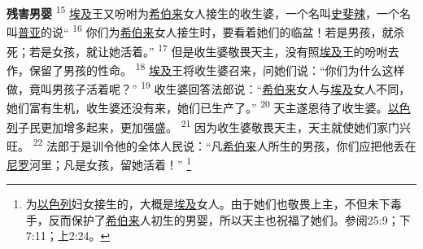 \begin{multicols}{2}
\textbf{残害男婴 }
\textsuperscript{15}
\uline{埃及}王又吩咐为\uline{希伯来}女人接生的收生婆，一个名叫\uline{史斐辣}，一个名叫\uline{普亚}的说“
\textsuperscript{16}
你们为\uline{希伯来}女人接生时，要看着她们的临盆！若是男孩，就杀死；若是女孩，就让她活着。”
\textsuperscript{17}
但是收生婆敬畏天主，没有照\uline{埃及}王的吩咐去作，保留了男孩的性命。
\textsuperscript{18}
\uline{埃及}王将收生婆召来，问她们说：“你们为什么这样做，竟叫男孩子活着呢？”
\textsuperscript{19}
收生婆回答法郎说：“\uline{希伯来}女人与\uline{埃及}女人不同，她们富有生机，收生婆还没有来，她们已生产了。”
\textsuperscript{20}
天主遂恩待了收生婆。\uline{以色列}子民更加增多起来，更加强盛。
\textsuperscript{21}
因为收生婆敬畏天主，天主就使她们家门兴旺。
\textsuperscript{22}
法郎于是训令他的全体人民说：“凡\uline{希伯来}人所生的男孩，你们应把他丢在\uline{尼罗}河里；凡是女孩，留她活着！”
\footnote{为\uline{以色列}妇女接生的，大概是\uline{埃及}女人。由于她们也敬畏上主，不但未下毒手，反而保护了\uline{希伯来}人初生的男婴，所以天主也祝福了她们。参阅25:9；下7:11；上2:24。}

\end{multicols}
